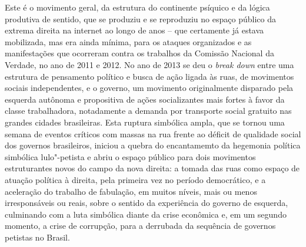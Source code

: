 Este é o movimento geral, da estrutura do continente psíquico e da
lógica produtiva de sentido, que se produziu e se reproduziu no espaço
público da extrema direita na internet ao longo de anos -- que
certamente já estava mobilizada, mas era ainda mínima, para os ataques
organizados e as manifestações que ocorreram contra os trabalhos da
Comissão Nacional da Verdade, no ano de 2011 e 2012. No ano de 2013 se
deu o \emph{break down} entre uma estrutura de pensamento político e
busca de ação ligada às ruas, de movimentos sociais independentes, e o
governo, um movimento originalmente disparado pela esquerda autônoma e
propositiva de ações socializantes mais fortes à favor da classe
trabalhadora, notadamente a demanda por transporte social gratuito nas
grandes cidades brasileiras. Esta ruptura simbólica ampla, que se tornou
uma semana de eventos críticos com massas na rua frente ao déficit de
qualidade social dos governos brasileiros, iniciou a quebra do
encantamemto da hegemonia política simbólica lulo"-petista e abriu o
espaço público para dois movimentos estruturantes novos do campo da nova
direita: a tomada das ruas como espaço de atuação política à direita,
pela primeira vez no período democrático, e a aceleração do trabalho de
fabulação, em muitos níveis, mais ou menos irresponsáveis ou reais,
sobre o sentido da experiência do governo de esquerda, culminando com a
luta simbólica diante da crise econômica e, em um segundo momento, a
crise de corrupção, para a derrubada da sequência de governos petistas
no Brasil.

